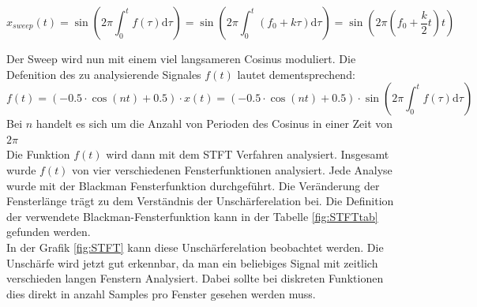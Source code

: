 \begin{equation}
x_{sweep}(t)=\sin \left(2 \pi \int_{0}^{t} f(\tau) \mathrm{d} \tau\right)=\sin \left(2 \pi \int_{0}^{t}\left(f_{0}+k \tau\right) \mathrm{d} \tau\right)=\sin \left(2 \pi\left(f_{0}+\frac{k}{2} t\right) t\right)
\end{equation} 

Der Sweep wird nun mit einem viel langsameren Cosinus moduliert. Die Defenition des zu analysierende Signales $f(t)$ lautet dementsprechend:
\begin{equation}
f(t)= (-0.5\cdot \cos(nt)+0.5)\cdot x(t)=(-0.5\cdot \cos(nt)+0.5)\cdot \sin \left(2 \pi \int_{0}^{t} f(\tau) \mathrm{d} \tau\right)
\end{equation} \label{eq:sin-sweep}
Bei $n$ handelt es sich um die Anzahl von Perioden des Cosinus in einer Zeit von $2\pi$\\
Die Funktion $f(t)$  wird dann mit dem STFT Verfahren analysiert. Insgesamt wurde $f(t)$ von vier verschiedenen Fensterfunktionen analysiert. Jede Analyse wurde mit der Blackman Fensterfunktion durchgeführt. Die Veränderung der Fensterlänge trägt zu dem Verständnis der Unschärferelation bei. Die Definition der verwendete Blackman-Fensterfunktion kann in der Tabelle \ref{fig:STFTtab} gefunden werden.\\


In der Grafik \ref{fig:STFT} kann diese Unschärferelation beobachtet werden. Die Unschärfe wird jetzt gut erkennbar, da man ein beliebiges Signal mit zeitlich verschieden langen Fenstern Analysiert. Dabei sollte bei diskreten Funktionen dies direkt in anzahl Samples pro Fenster gesehen werden muss.\\



